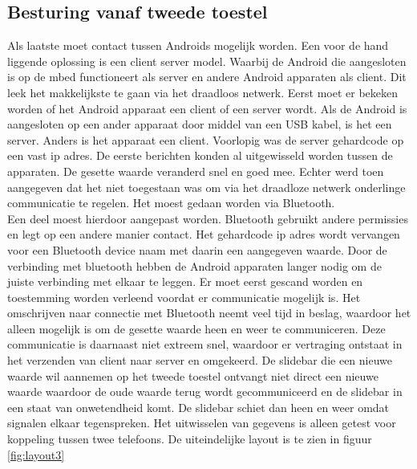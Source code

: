 \documentclass[a4paper]{article}
\begin{document}
		\subsection{Besturing vanaf tweede toestel}
			Als laatste moet contact tussen Androids mogelijk worden. Een voor de hand liggende oplossing is een client server model. Waarbij de Android die aangesloten is op de mbed functioneert als server en andere Android apparaten als client. Dit leek het makkelijkste te gaan via het draadloos netwerk. Eerst moet er bekeken worden of het Android apparaat een client of een server wordt. Als de Android is aangesloten op een ander apparaat door middel van een USB kabel, is het een server. Anders is het apparaat een client. Voorlopig was de server gehardcode op een vast ip adres. De eerste berichten konden al uitgewisseld worden tussen de apparaten. De gesette waarde veranderd snel en goed mee. Echter werd toen aangegeven dat het niet toegestaan was om via het draadloze netwerk onderlinge communicatie te regelen. Het moest gedaan worden via Bluetooth.\\
Een deel moest hierdoor aangepast worden. Bluetooth gebruikt andere permissies en legt op een andere manier contact. Het gehardcode ip adres wordt vervangen voor een Bluetooth device naam met daarin een aangegeven waarde. Door de verbinding met bluetooth hebben de Android apparaten langer nodig om de juiste verbinding met elkaar te leggen. Er moet eerst gescand worden en toestemming worden verleend voordat er communicatie mogelijk is. Het omschrijven naar connectie met Bluetooth neemt veel tijd in beslag, waardoor het alleen mogelijk is om de gesette waarde heen en weer te communiceren. Deze communicatie is daarnaast niet extreem snel, waardoor er vertraging ontstaat in het verzenden van client naar server en omgekeerd. De slidebar die een nieuwe waarde wil aannemen op het tweede toestel ontvangt niet direct een nieuwe waarde waardoor de oude waarde terug wordt gecommuniceerd en de slidebar in een staat van onwetendheid komt. De slidebar schiet dan heen en weer omdat signalen elkaar tegenspreken. Het uitwisselen van gegevens is alleen getest voor koppeling tussen twee telefoons. De uiteindelijke layout is te zien in figuur \ref{fig:layout3}
\end{document}
